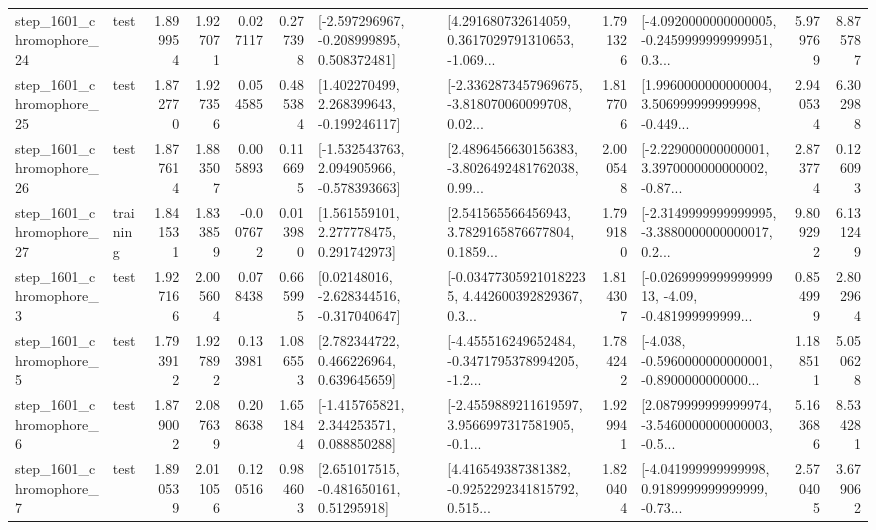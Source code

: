 \begin{tabular}{llrrrrllrlrr}
 step\_1601\_chromophore\_24 &      test &      1.899954 &    1.927071 &      0.027117 &  0.277398 &   [-2.597296967, -0.208999895, 0.508372481] &  [4.291680732614059, 0.3617029791310653, -1.069... &       1.791326 &  [-4.0920000000000005, -0.2459999999999951, 0.3... &            5.979769 &          8.875787 \\
 step\_1601\_chromophore\_25 &      test &      1.872770 &    1.927356 &      0.054585 &  0.485384 &    [1.402270499, 2.268399643, -0.199246117] &  [-2.3362873457969675, -3.818070060099708, 0.02... &       1.817706 &  [1.9960000000000004, 3.506999999999998, -0.449... &            2.940534 &          6.302988 \\
 step\_1601\_chromophore\_26 &      test &      1.877614 &    1.883507 &      0.005893 &  0.116695 &   [-1.532543763, 2.094905966, -0.578393663] &  [2.4896456630156383, -3.8026492481762038, 0.99... &       2.000548 &  [-2.229000000000001, 3.3970000000000002, -0.87... &            2.873774 &          0.126093 \\
 step\_1601\_chromophore\_27 &  training &      1.841531 &    1.833859 &     -0.007672 &  0.013980 &     [1.561559101, 2.277778475, 0.291742973] &  [2.541565566456943, 3.7829165876677804, 0.1859... &       1.799180 &  [-2.3149999999999995, -3.3880000000000017, 0.2... &            9.809292 &          6.131249 \\
  step\_1601\_chromophore\_3 &      test &      1.927166 &    2.005604 &      0.078438 &  0.665995 &    [0.02148016, -2.628344516, -0.317040647] &  [-0.034773059210182235, 4.442600392829367, 0.3... &       1.814307 &  [-0.026999999999999913, -4.09, -0.481999999999... &            0.854999 &          2.802964 \\
  step\_1601\_chromophore\_5 &      test &      1.793912 &    1.927892 &      0.133981 &  1.086553 &     [2.782344722, 0.466226964, 0.639645659] &  [-4.455516249652484, -0.3471795378994205, -1.2... &       1.784242 &  [-4.038, -0.5960000000000001, -0.8900000000000... &            1.188511 &          5.050628 \\
  step\_1601\_chromophore\_6 &      test &      1.879002 &    2.087639 &      0.208638 &  1.651844 &    [-1.415765821, 2.344253571, 0.088850288] &  [-2.4559889211619597, 3.9566997317581905, -0.1... &       1.929941 &  [2.0879999999999974, -3.5460000000000003, -0.5... &            5.163686 &          8.534281 \\
  step\_1601\_chromophore\_7 &      test &      1.890539 &    2.011056 &      0.120516 &  0.984603 &     [2.651017515, -0.481650161, 0.51295918] &  [4.416549387381382, -0.9252292341815792, 0.515... &       1.820404 &  [-4.041999999999998, 0.9189999999999999, -0.73... &            2.570405 &          3.679062 \\

\end{tabular}
